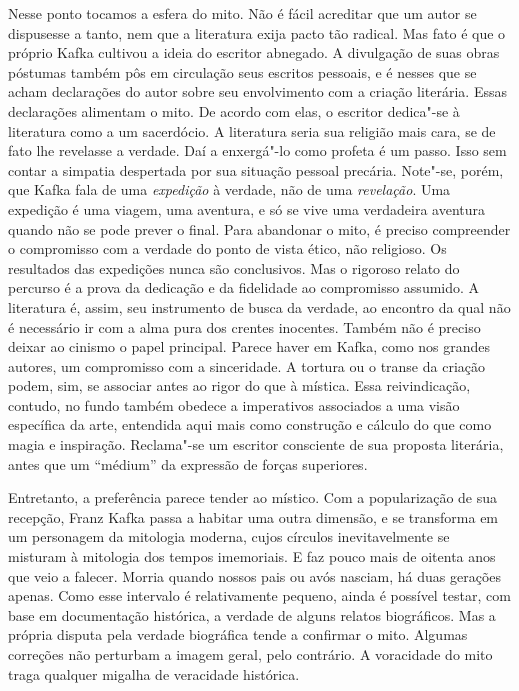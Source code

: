 Nesse ponto tocamos a esfera do mito. Não é fácil acreditar que um autor
se dispusesse a tanto, nem que a literatura exija pacto tão radical.
Mas fato é que o próprio Kafka cultivou a ideia do escritor abnegado. A
divulgação de suas obras póstumas também pôs em circulação seus
escritos pessoais, e é nesses que se acham declarações do autor sobre
seu envolvimento com a criação literária. Essas declarações alimentam o
mito. De acordo com elas, o escritor dedica"-se à literatura como a um
sacerdócio. A literatura seria sua religião mais cara, se de fato lhe
revelasse a verdade. Daí a enxergá"-lo como profeta é um passo. Isso
sem contar a simpatia despertada por sua situação pessoal precária.
Note"-se, porém, que Kafka fala de uma \textit{expedição} à verdade,
não de uma \textit{revelação}. Uma expedição é uma viagem, uma
aventura, e só se vive uma verdadeira aventura quando não se pode
prever o final. Para abandonar o mito, é preciso compreender o
compromisso com a verdade do ponto de vista ético, não religioso. Os
resultados das expedições nunca são conclusivos. Mas o rigoroso relato
do percurso é a prova da dedicação e da fidelidade ao compromisso
assumido. A literatura é, assim, seu instrumento de busca da verdade,
ao encontro da qual não é necessário ir com a alma pura dos crentes
inocentes. Também não é preciso deixar ao cinismo o papel principal.
Parece haver em Kafka, como nos grandes autores, um compromisso com a
sinceridade. A tortura ou o transe da criação podem, sim, se associar antes ao
rigor do que à mística. Essa reivindicação, contudo, no fundo também
obedece a imperativos associados a uma visão específica da arte,
entendida aqui mais como construção e cálculo do que como magia e
inspiração. Reclama"-se um escritor consciente de sua proposta
literária, antes que um “médium” da expressão de forças superiores.

Entretanto, a preferência parece tender ao místico. 
Com a popularização de sua recepção, Franz Kafka
passa a habitar uma outra dimensão, e se transforma em um personagem da
mitologia moderna, cujos círculos inevitavelmente se misturam à
mitologia dos tempos imemoriais. E faz pouco mais de oitenta anos que
veio a falecer. Morria quando nossos pais ou avós nasciam, há duas
gerações apenas. Como esse intervalo é relativamente pequeno, ainda é
possível testar, com base em documentação histórica, a verdade de
alguns relatos biográficos. Mas a própria disputa pela verdade biográfica tende a confirmar
o mito. Algumas correções não perturbam a imagem geral, pelo contrário.
A voracidade do mito traga qualquer migalha de veracidade histórica.

